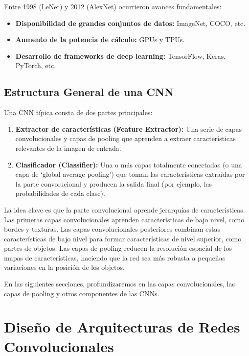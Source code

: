 \documentclass{article}
\begin{document}
Entre 1998 (LeNet) y 2012 (AlexNet) ocurrieron avances fundamentales:

\begin{itemize}
  \item  \textbf{Disponibilidad de grandes conjuntos de datos:} ImageNet, COCO, etc.
  \item \textbf{Aumento de la potencia de cálculo:} GPUs y TPUs.
\item  \textbf{Desarrollo de frameworks de deep learning:} TensorFlow, Keras, PyTorch, etc.
\end{itemize}

\subsection{Estructura General de una CNN}

Una CNN típica consta de dos partes principales:

\begin{enumerate}
    \item \textbf{Extractor de características (Feature Extractor):}  Una serie de capas convolucionales y capas de pooling que aprenden a extraer características relevantes de la imagen de entrada.
    \item \textbf{Clasificador (Classifier):}  Una o más capas totalmente conectadas (o una capa de `global average pooling') que toman las características extraídas por la parte convolucional y producen la salida final (por ejemplo, las probabilidades de cada clase).
\end{enumerate}

La idea clave es que la parte convolucional aprende jerarquías de características.  Las primeras capas convolucionales aprenden características de bajo nivel, como bordes y texturas.  Las capas convolucionales posteriores combinan estas características de bajo nivel para formar características de nivel superior, como partes de objetos.  Las capas de pooling reducen la resolución espacial de los mapas de características, haciendo que la red sea más robusta a pequeñas variaciones en la posición de los objetos.

En las siguientes secciones, profundizaremos en las capas convolucionales, las capas de pooling y otros componentes de las CNNs.

\section{Diseño de Arquitecturas de Redes Convolucionales}
\end{document}
